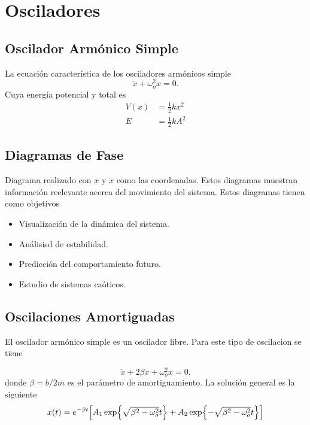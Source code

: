 \section{Osciladores}

\subsection{Oscilador Armónico Simple}
 La ecuación característica de los osciladores armónicos simple
\begin{equation}
	\ddot{x} + \omega _o ^2 x = 0.
\end{equation}
Cuya energía potencial y total es
\begin{align*}
	V(x) &= \frac{1}{2} kx^2 \\
	E &= \frac{1}{2} kA^2 
\end{align*}





\subsection{Diagramas de Fase}
Diagrama realizado con $x$ y $\dot{x}$ como las coordenadas. Estos diagramas muestran información reelevante acerca del movimiento del sistema. Estos diagramas tienen como objetivos
\begin{itemize}
	\item Visualización de la dinámica del sistema.
	\item Análisisd de estabilidad.
	\item Predicción del comportamiento futuro.
	\item Estudio de sistemas caóticos.
\end{itemize}


\subsection{Oscilaciones Amortiguadas}
El oscilador armónico simple es un oscilador libre. Para este tipo de oscilacion se tiene

\begin{equation}
	\ddot{x} + 2\beta \dot{x} + \omega _o ^2 x = 0.
\end{equation}
donde $\beta = b/2m$ es el parámetro de amortiguamiento. La solución general es la siguiente
\begin{equation}
	x(t) = e^{-\beta t} \qty[A_1 \exp{\sqrt{\beta ^2 - \omega _o ^2}t} + A_2 \exp{-\sqrt{\beta ^2 - \omega _o ^2}t}]
\end{equation}

